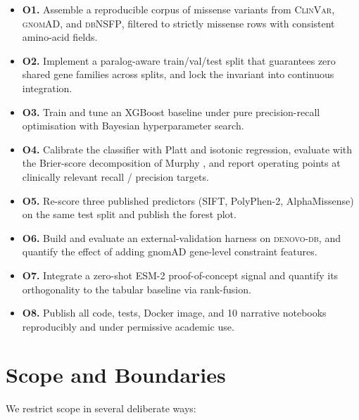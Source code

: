 \documentclass[11pt,a4paper,oneside]{report}
\begin{document}
\begin{itemize}[leftmargin=*,itemsep=0.3em]
\item \textbf{O1.} Assemble a reproducible corpus of missense
variants from \textsc{ClinVar}, \textsc{gnomAD}, and
\textsc{dbNSFP}, filtered to strictly missense rows with
consistent amino-acid fields.
\item \textbf{O2.} Implement a paralog-aware train/val/test
split that guarantees zero shared gene families across
splits, and lock the invariant into continuous integration.
\item \textbf{O3.} Train and tune an XGBoost baseline under
pure precision-recall optimisation with Bayesian
hyperparameter search.
\item \textbf{O4.} Calibrate the classifier with Platt and
isotonic regression, evaluate with the Brier-score
decomposition of Murphy \citep{murphy1973brier}, and report
operating points at clinically relevant recall / precision
targets.
\item \textbf{O5.} Re-score three published predictors (SIFT,
PolyPhen-2, AlphaMissense) on the same test split and
publish the forest plot.
\item \textbf{O6.} Build and evaluate an external-validation
harness on \textsc{denovo-db}, and quantify the effect of
adding gnomAD gene-level constraint features.
\item \textbf{O7.} Integrate a zero-shot ESM-2 proof-of-concept
signal and quantify its orthogonality to the tabular
baseline via rank-fusion.
\item \textbf{O8.} Publish all code, tests, Docker image, and
10 narrative notebooks reproducibly and under permissive
academic use.
\end{itemize}

\section{Scope and Boundaries}
\label{sec:intro-scope}

We restrict scope in several deliberate ways:
\end{document}
